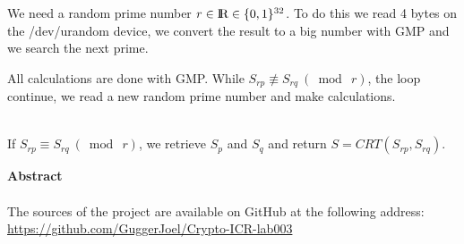 \documentclass[a4paper]{report}
\def\R{\textrm{I\kern-0.21emR}}
\begin{document}

We need a random prime number $r \in \R \in \{0,1\}^{32}$. To do this we read 4 bytes on the /dev/urandom device, we convert the result to a big number with GMP and we search the next prime.


All calculations are done with GMP. While $S_{rp} \not\equiv S_{rq}\ (\bmod\ r)$, the loop continue, we read a new random prime number and make calculations.

\
\\
If $S_{rp} \equiv S_{rq}\ (\bmod\ r)$, we retrieve $S_{p}$ and $S_{q}$ and return $S = CRT(S_{rp}, S_{rq})$.


\newpage
\vspace*{6 cm}
\begin{center}
\textbf{Abstract} \\
\ \\
The sources of the project are available on GitHub at the following address: \\
\href{https://github.com/GuggerJoel/Crypto-ICR-lab003}{\url{https://github.com/GuggerJoel/Crypto-ICR-lab003}}
\end{center}
\end{document}
